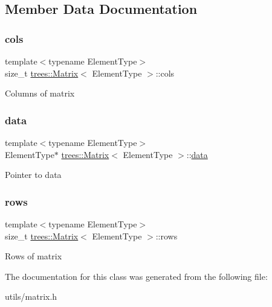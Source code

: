 \subsection{Member Data Documentation}
\mbox{\label{classtrees_1_1_matrix_a612011a0ae81b3e9d0a7e44a7e827f5c}} 
\subsubsection{\texorpdfstring{cols}{cols}}
{\footnotesize\ttfamily template$<$typename Element\+Type$>$ \\
size\+\_\+t \hyperlink{classtrees_1_1_matrix}{trees\+::\+Matrix}$<$ Element\+Type $>$\+::cols}

Columns of matrix \mbox{\label{classtrees_1_1_matrix_ac7cf0dc5123d2df5cfbac43c5b3c3ee6}} 
\subsubsection{\texorpdfstring{data}{data}}
{\footnotesize\ttfamily template$<$typename Element\+Type$>$ \\
Element\+Type$\ast$ \hyperlink{classtrees_1_1_matrix}{trees\+::\+Matrix}$<$ Element\+Type $>$\+::\hyperlink{structdata}{data}}

Pointer to data \mbox{\label{classtrees_1_1_matrix_a88dfff3f217f59caec11e519b23153f6}} 
\subsubsection{\texorpdfstring{rows}{rows}}
{\footnotesize\ttfamily template$<$typename Element\+Type$>$ \\
size\+\_\+t \hyperlink{classtrees_1_1_matrix}{trees\+::\+Matrix}$<$ Element\+Type $>$\+::rows}

Rows of matrix 

The documentation for this class was generated from the following file\+:\begin{DoxyCompactItemize}
\item 
utils/matrix.\+h\end{DoxyCompactItemize}
